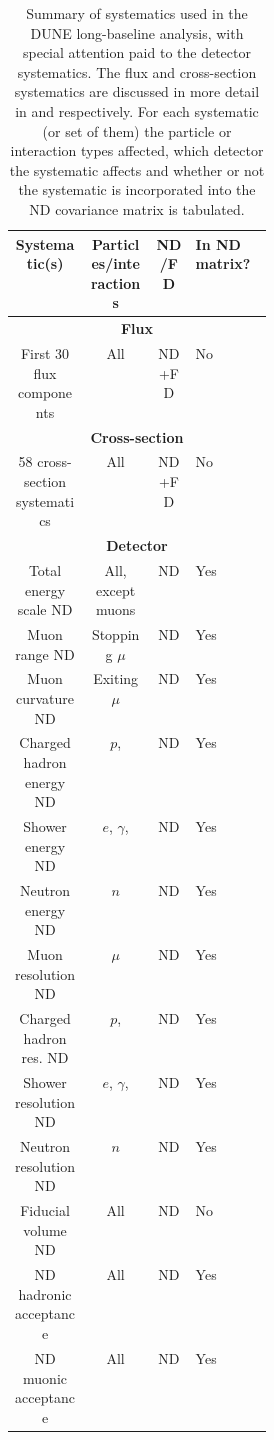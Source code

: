 \begin{table}
	\caption[Summary of systematic uncertainties used in the DUNE long-baseline analysis]{Summary of systematics used in the DUNE long-baseline analysis, with special attention paid to the detector systematics. The flux and cross-section systematics are discussed in more detail in  and  respectively. For each systematic (or set of them) the particle or interaction types affected, which detector the systematic affects and whether or not the systematic is incorporated into the ND covariance matrix is tabulated.}
	\label{tab:systSummary}
	\centering
	\begin{tabular}{c c c p{0.3\linewidth}}
		\hline
		\hline
		Systematic(s) & Particles/interactions & ND/FD & In ND matrix? \\
		\hline
		\multicolumn{4}{c}{\textbf{Flux}} \\
		\hline
		First 30 flux components & All & ND+FD & No \\
		\hline
		\multicolumn{4}{c}{\textbf{Cross-section}} \\
		\hline
		\num{58} cross-section systematics & All & ND+FD & No \\ 
		\hline
		\multicolumn{4}{c}{\textbf{Detector}} \\
		\hline
		Total energy scale ND & All, except muons & ND & Yes \\
		Muon range ND & Stopping $\mu$ & ND & Yes \\
		Muon curvature ND & Exiting $\mu$ & ND & Yes \\
		Charged hadron energy ND & $p$, \pipm & ND & Yes \\
		Shower energy ND & $e$, $\gamma$, \pizero & ND & Yes \\
		Neutron energy ND & $n$ & ND & Yes \\
		Muon resolution ND & $\mu$ & ND & Yes \\
		Charged hadron res. ND & $p$, \pipm & ND & Yes \\		
		Shower resolution ND & $e$, $\gamma$, \pizero & ND & Yes \\
		Neutron resolution ND & $n$ & ND & Yes \\		
		Fiducial volume ND & All & ND & No \\
		ND hadronic acceptance & All & ND & Yes \\
		ND muonic acceptance & All & ND & Yes \\
		

\end{tabular}
\end{table}
